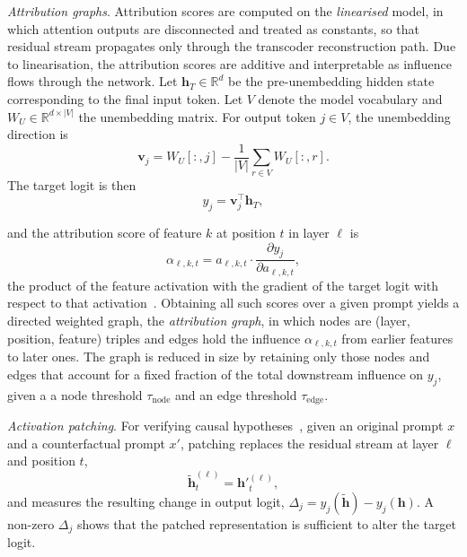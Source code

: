 \vspace{3 mm}
\textit{Attribution graphs}. Attribution scores are computed on the \textit{linearised} model, in which attention outputs
are disconnected and treated as constants, so that residual stream propagates only through the
transcoder reconstruction path.  Due to linearisation, the attribution scores
are additive and interpretable as influence flows through the network.  
Let \(\mathbf{h}_T \in \mathbb{R}^d\) be the pre-unembedding hidden
state corresponding to the final input token. Let \(V\) denote the model vocabulary and
\(W_U \in \mathbb{R}^{d \times |V|}\) the unembedding matrix. For output token
\(j \in V\), the unembedding direction is
\begin{equation}
    \mathbf{v}_j
    =
    W_U[:,j]
    -
    \frac{1}{|V|}\sum_{r \in V} W_U[:,r].
    \label{eq:demeaned-unembedding}
\end{equation}
The target logit is then
\begin{equation}
    y_j = \mathbf{v}_j^\top \mathbf{h}_T ,
    \label{eq:target-logit}
\end{equation}


and the attribution score
of feature $k$ at position $t$ in layer $\ell$ is
\begin{equation}
    \alpha_{\ell,k,t}
      = a_{\ell,k,t}
        \cdot \frac{\partial y_j}{\partial a_{\ell,k,t}},
    \label{eq:attribution}
\end{equation}
the product of the feature activation with the gradient of the target logit with respect to
that activation~\citep{lindsey2025biology}.  Obtaining all such scores over a given prompt
yields a directed weighted graph, the \textit{attribution graph}, in which nodes are
(layer, position, feature) triples and edges hold the influence $\alpha_{\ell,k,t}$ from
earlier features to later ones.  The graph is reduced in size by retaining only those nodes and edges that account for a fixed fraction of the total downstream influence on $y_j$, given a
a node threshold $\tau_\mathrm{node}$ and an edge threshold $\tau_\mathrm{edge}$.

\textit{Activation patching}. For verifying causal hypotheses~\citep{meng2022locating, conmy2023automated}, given an original prompt
$x$ and a counterfactual prompt $x'$, patching replaces the residual stream at layer $\ell$
and position $t$,
\begin{equation}
    \tilde{\mathbf{h}}^{(\ell)}_t = \mathbf{h}'^{(\ell)}_t,
    \label{eq:patching}
\end{equation}
and measures the resulting change in output logit,
$\Delta_j = y_j(\tilde{\mathbf{h}}) - y_j(\mathbf{h})$.  A non-zero $\Delta_j$ shows
that the patched representation is sufficient to alter the target logit. 

